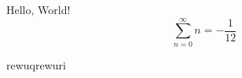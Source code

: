 \documentclass{article}
\begin{document}
Hello, World!
\[
\sum_{n=0}^{\infty} n = -\frac{1}{12}
\]

rewuqrewuri
\end{document}
